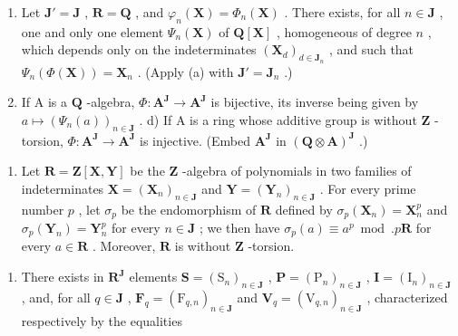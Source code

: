\begin{enumerate}
\def\labelenumi{\alph{enumi})}
\setcounter{enumi}{1}
\item
  Let \(\mathbf{J}' = \mathbf{J}\) , \(\mathbf{R} = \mathbf{Q}\) , and \(\varphi_n(\mathbf{X}) = \Phi_n(\mathbf{X})\) . There exists, for all \(n \in \mathbf{J}\) , one and only one element \(\Psi_n(\mathbf{X})\) of \(\mathbf{Q}[\mathbf{X}]\) , homogeneous of degree \(n\) , which depends only on the indeterminates \((\mathbf{X}_d)_{d \in \mathbf{J}_n}\) , and such that \(\Psi_n(\Phi(\mathbf{X})) = \mathbf{X}_n\) . (Apply (a) with \(\mathbf{J}' = \mathbf{J}_{n}\) .)
\item
  If A is a \(\mathbf{Q}\) -algebra, \(\Phi: \mathbf{A}^{\mathbf{J}} \to \mathbf{A}^{\mathbf{J}}\) is bijective, its inverse being given by \(a \mapsto (\Psi_n(a))_{n \in \mathbf{J}}\) . d) If A is a ring whose additive group is without \(\mathbf{Z}\) -torsion, \(\Phi: \mathbf{A}^{\mathbf{J}} \to \mathbf{A}^{\mathbf{J}}\) is injective. (Embed \(\mathbf{A}^{\mathbf{J}}\) in \((\mathbf{Q} \otimes \mathbf{A})^{\mathbf{J}}\) .)
\end{enumerate}

\begin{enumerate}
\def\labelenumi{\arabic{enumi})}
\setcounter{enumi}{33}
\tightlist
\item
  Let \(\mathbf{R} = \mathbf{Z}[\mathbf{X},\mathbf{Y}]\) be the \(\mathbf{Z}\) -algebra of polynomials in two families of indeterminates \(\mathbf{X} = (\mathbf{X}_n)_{n\in \mathbf{J}}\) and \(\mathbf{Y} = (\mathbf{Y}_n)_{n\in \mathbf{J}}\) . For every prime number \(p\) , let \(\sigma_p\) be the endomorphism of \(\mathbf{R}\) defined by \(\sigma_p(\mathbf{X}_n) = \mathbf{X}_n^p\) and \(\sigma_p(\mathbf{Y}_n) = \mathbf{Y}_n^p\) for every \(n\in \mathbf{J}\) ; we then have \(\sigma_p(a)\equiv a^p\bmod .p\mathbf{R}\) for every \(a\in \mathbf{R}\) . Moreover, \(\mathbf{R}\) is without \(\mathbf{Z}\) -torsion.
\end{enumerate}

\begin{enumerate}
\def\labelenumi{\alph{enumi})}
\tightlist
\item
  There exists in \(\mathbf{R}^{\mathbf{J}}\) elements \(\mathbf{S} = (\mathrm{S}_n)_{n\in \mathbf{J}}\) , \(\mathbf{P} = (\mathrm{P}_n)_{n\in \mathbf{J}}\) , \(\mathbf{I} = (\mathrm{I}_n)_{n\in \mathbf{J}}\) , and, for all \(q\in \mathbf{J}\) , \(\mathbf{F}_q = (\mathrm{F}_{q,n})_{n\in \mathbf{J}}\) and \(\mathbf{V}_q = (\mathrm{V}_{q,n})_{n\in \mathbf{J}}\) , characterized respectively by the equalities
\end{enumerate}

